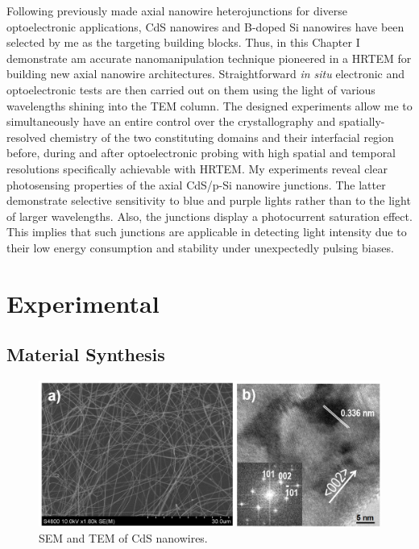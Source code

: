 Following previously made axial nanowire heterojunctions for diverse optoelectronic applications, CdS nanowires and B-doped Si nanowires have been selected by me as the targeting building blocks. Thus, in this Chapter I demonstrate am accurate nanomanipulation technique pioneered  in a HRTEM for building new axial nanowire architectures. Straightforward \emph{in situ} electronic and optoelectronic tests are then carried out on them using the light of various wavelengths shining into the TEM column. The designed experiments allow me to simultaneously have an entire control over the crystallography and spatially-resolved chemistry of the two constituting domains and their interfacial region before, during and after optoelectronic probing with high spatial and temporal resolutions specifically achievable with HRTEM. 
My experiments reveal clear photosensing properties of the axial CdS/p-Si nanowire junctions. The latter demonstrate selective sensitivity to blue and purple lights rather than to the light of larger wavelengths. Also, the junctions display a photocurrent saturation effect. This implies that such junctions are applicable in detecting light intensity due to their low energy consumption and stability under unexpectedly pulsing biases. 

\section{Experimental}
\subsection{Material Synthesis}

\begin{figure}  
\includegraphics[width=\textwidth]{figures/figure3_s1}
\caption[SEM and TEM of CdS nanowires.]{SEM and TEM of CdS nanowires.
\label{fig:fig3_s1}}
\end{figure}

